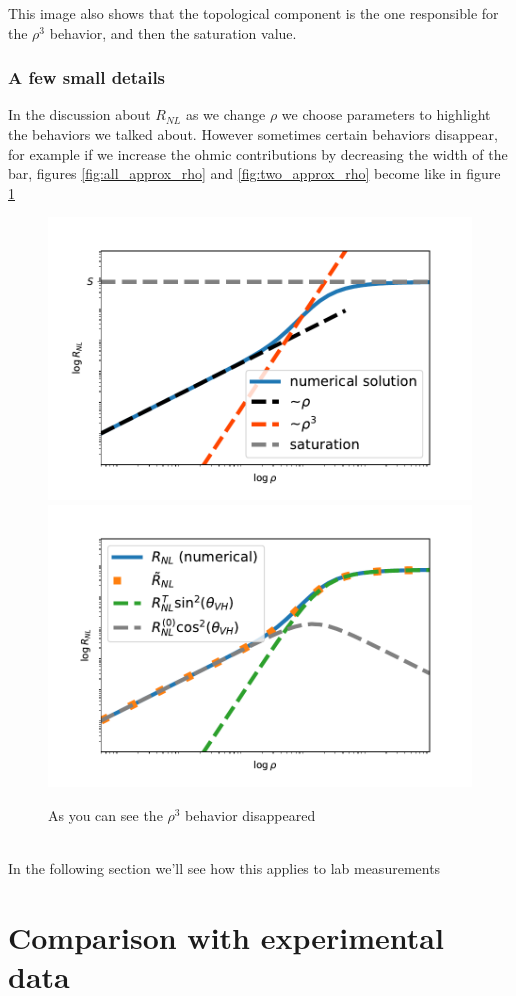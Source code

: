 This image also shows that the topological component is the one responsible for the $\rho^3$ behavior, and then the saturation value.

\subsubsection*{A few small details}
In the discussion about $R_{NL}$ as we change $\rho$ we choose parameters to highlight the behaviors we talked about. However sometimes certain behaviors disappear, for example if we increase the ohmic contributions by decreasing the width of the bar, figures \ref{fig:all_approx_rho} and \ref{fig:two_approx_rho} become like in figure \ref{fig:mixedrho}
\begin{figure}[h!]
    \centering
    \includegraphics[width=.49\linewidth]{Immagini/rnl/mixed_all_approx_rho.pdf}
    \includegraphics[width=.49\linewidth]{Immagini/rnl/mixed_approx_rho.pdf}
    \caption{As you can see the $\rho^3$ behavior disappeared}
    \label{fig:mixedrho}
\end{figure}\\
In the following section we'll see how this applies to lab measurements


\section{Comparison with experimental data}
